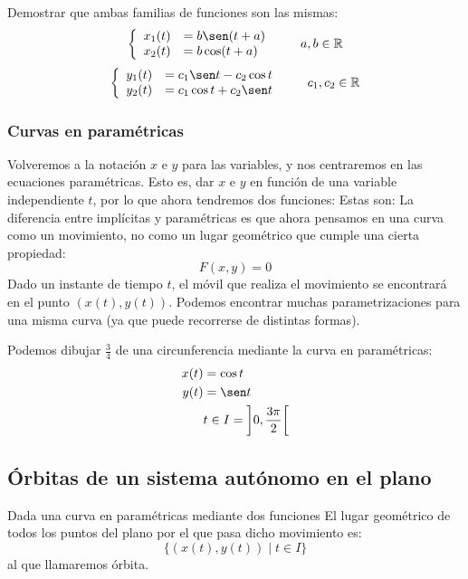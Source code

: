 \begin{ejercicio*}
    Demostrar que ambas familias de funciones son las mismas:
    \begin{equation*}
        \left\{\begin{array}{rl}
                x_1(t) &= b \sen (t+a) \\
                x_2(t) &= b \cos (t+a)
        \end{array}\right. \qquad a,b \in \mathbb{R}
    \end{equation*}
    \begin{equation*}
        \left\{\begin{array}{rl}
                y_1(t) &= c_1 \sen t - c_2 \cos t \\
                y_2(t) &= c_1 \cos t + c_2 \sen t
        \end{array}\right. \qquad c_1, c_2 \in \mathbb{R}
    \end{equation*}
\end{ejercicio*}

\subsubsection{Curvas en paramétricas}
Volveremos a la notación $x$ e $y$ para las variables, y nos centraremos en las ecuaciones paramétricas. Esto es, dar $x$ e $y$ en función de una variable independiente $t$, por lo que ahora tendremos dos funciones:
Estas son:
La diferencia entre implícitas y paramétricas es que ahora pensamos en una curva como un movimiento, no como un lugar geométrico que cumple una cierta propiedad: 
\begin{equation*}
    F(x,y) = 0
\end{equation*}
Dado un instante de tiempo $t$, el móvil que realiza el movimiento se encontrará en el punto $(x(t), y(t))$.
Podemos encontrar muchas parametrizaciones para una misma curva (ya que puede recorrerse de distintas formas).
\begin{ejemplo}
    Podemos dibujar $\frac{3}{4}$ de una circunferencia mediante la curva en paramétricas:
    \begin{align*}
        x(t) &= \cos t \\
        y(t) &= \sen t \\
             & t \in I=\left]0, \dfrac{3\pi}{2}\right[
    \end{align*}
\end{ejemplo}

\subsection{Órbitas de un sistema autónomo en el plano}
\begin{definicion}[Órbita]
Dada una curva en paramétricas mediante dos funciones
El lugar geométrico de todos los puntos del plano por el que pasa dicho movimiento es:
\begin{equation*}
    \{(x(t),y(t)) \mid t\in I\}
\end{equation*}
al que llamaremos órbita.
\end{definicion}

